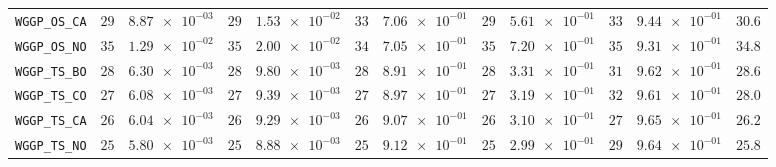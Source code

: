 \begin{table}[H]
\begin{tabularx}{\textwidth}{l||cC|cC|cC|cC|cC||c}
		\texttt{WGGP\_OS\_CA} & $ 29$ & $ \num{8.87e-03}$ & $ 29$ & $ \num{1.53e-02}$ & $ 33$ & $ \num{7.06e-01}$ & $ 29$ & $ \num{5.61e-01}$ & $ 33$ & $ \num{9.44e-01}$ & $ 30.6$  \\
		\texttt{WGGP\_OS\_NO} & $ 35$ & $ \num{1.29e-02}$ & $ 35$ & $ \num{2.00e-02}$ & $ 34$ & $ \num{7.05e-01}$ & $ 35$ & $ \num{7.20e-01}$ & $ 35$ & $ \num{9.31e-01}$ & $ 34.8$  \\
		\texttt{WGGP\_TS\_BO} & $ 28$ & $ \num{6.30e-03}$ & $ 28$ & $ \num{9.80e-03}$ & $ 28$ & $ \num{8.91e-01}$ & $ 28$ & $ \num{3.31e-01}$ & $ 31$ & $ \num{9.62e-01}$ & $ 28.6$  \\
		\texttt{WGGP\_TS\_CO} & $ 27$ & $ \num{6.08e-03}$ & $ 27$ & $ \num{9.39e-03}$ & $ 27$ & $ \num{8.97e-01}$ & $ 27$ & $ \num{3.19e-01}$ & $ 32$ & $ \num{9.61e-01}$ & $ 28.0$  \\
		\texttt{WGGP\_TS\_CA} & $ 26$ & $ \num{6.04e-03}$ & $ 26$ & $ \num{9.29e-03}$ & $ 26$ & $ \num{9.07e-01}$ & $ 26$ & $ \num{3.10e-01}$ & $ 27$ & $ \num{9.65e-01}$ & $ 26.2$  \\
		\texttt{WGGP\_TS\_NO} & $ 25$ & $ \num{5.80e-03}$ & $ 25$ & $ \num{8.88e-03}$ & $ 25$ & $ \num{9.12e-01}$ & $ 25$ & $ \num{2.99e-01}$ & $ 29$ & $ \num{9.64e-01}$ & $ 25.8$  \\
	\end{tabularx}
\end{table}
